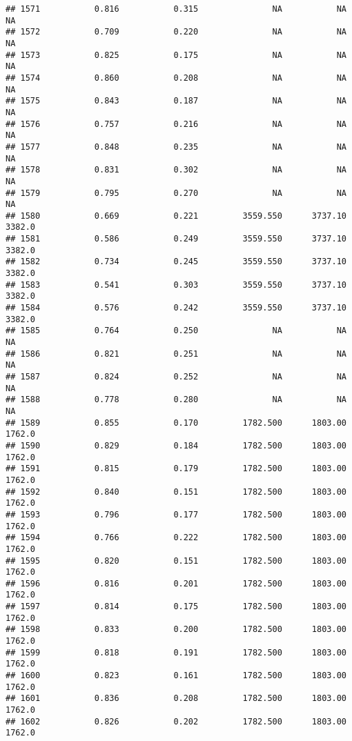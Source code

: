 \documentclass[
]{article}
\begin{document}
\begin{verbatim}
## 1571           0.816           0.315               NA           NA           NA
## 1572           0.709           0.220               NA           NA           NA
## 1573           0.825           0.175               NA           NA           NA
## 1574           0.860           0.208               NA           NA           NA
## 1575           0.843           0.187               NA           NA           NA
## 1576           0.757           0.216               NA           NA           NA
## 1577           0.848           0.235               NA           NA           NA
## 1578           0.831           0.302               NA           NA           NA
## 1579           0.795           0.270               NA           NA           NA
## 1580           0.669           0.221         3559.550      3737.10       3382.0
## 1581           0.586           0.249         3559.550      3737.10       3382.0
## 1582           0.734           0.245         3559.550      3737.10       3382.0
## 1583           0.541           0.303         3559.550      3737.10       3382.0
## 1584           0.576           0.242         3559.550      3737.10       3382.0
## 1585           0.764           0.250               NA           NA           NA
## 1586           0.821           0.251               NA           NA           NA
## 1587           0.824           0.252               NA           NA           NA
## 1588           0.778           0.280               NA           NA           NA
## 1589           0.855           0.170         1782.500      1803.00       1762.0
## 1590           0.829           0.184         1782.500      1803.00       1762.0
## 1591           0.815           0.179         1782.500      1803.00       1762.0
## 1592           0.840           0.151         1782.500      1803.00       1762.0
## 1593           0.796           0.177         1782.500      1803.00       1762.0
## 1594           0.766           0.222         1782.500      1803.00       1762.0
## 1595           0.820           0.151         1782.500      1803.00       1762.0
## 1596           0.816           0.201         1782.500      1803.00       1762.0
## 1597           0.814           0.175         1782.500      1803.00       1762.0
## 1598           0.833           0.200         1782.500      1803.00       1762.0
## 1599           0.818           0.191         1782.500      1803.00       1762.0
## 1600           0.823           0.161         1782.500      1803.00       1762.0
## 1601           0.836           0.208         1782.500      1803.00       1762.0
## 1602           0.826           0.202         1782.500      1803.00       1762.0

\end{verbatim}
\end{document}
